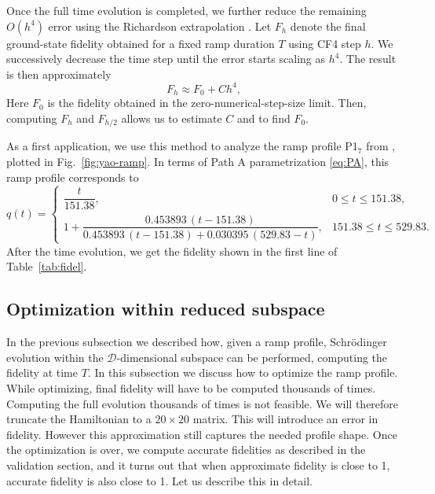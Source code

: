 \documentclass[a4paper,12pt]{article}
\theoremstyle{remark}
\theoremstyle{theorem}
\begin{document}
Once the full time evolution is completed, we further reduce the remaining $O(h^4)$ error using the Richardson extrapolation \cite{Richardson1911}.  Let $F_h$ denote the final ground-state fidelity obtained for a fixed ramp duration $T$ using CF4 step $h$.  We successively decrease the time step until the error starts scaling as $h^4$. The result is then approximately
\begin{equation}
F_{h}\approx F_{0}+C h^4,
\end{equation}
Here $F_{0}$ is the fidelity obtained in the zero-numerical-step-size limit.  Then, computing $F_h$ and $F_{h/2}$ allows us to estimate $ C$ and to find $F_{0}$.

As a first application, we use this method to analyze the ramp profile P1$_7$ from \cite{Fang:2024uyf}, plotted in Fig.~\ref{fig:yao-ramp}.
In terms of Path A parametrization \eqref{eq:PA}, this ramp profile corresponds to 
\begin{equation}
q(t)=
\begin{cases}
\dfrac{t}{151.38},
&0\leq t\leq151.38,\\[10pt]
1+
\dfrac{
0.453893\,(t-151.38)
}{
0.453893\,(t-151.38)
+
0.030395\,(529.83-t)
},
&151.38\leq t\leq529.83.
\end{cases}
\end{equation}
After the time evolution, we get the fidelity shown in the first line of Table~\ref{tab:fidel}. 

\subsection{Optimization within reduced subspace}\label{sec:reduced}

In the previous subsection we described how, given a ramp profile, Schr\"odinger evolution within the $\mathcal{D}$-dimensional subspace can be performed, computing the fidelity at time $T$. In this subsection we discuss how to optimize the ramp profile. While optimizing, final fidelity will have to be computed thousands of times. Computing the full evolution thousands of times is not feasible. We will therefore truncate the Hamiltonian to a $20\times 20$ matrix. This will introduce an error in fidelity. However this approximation still captures the needed profile shape. Once the optimization is over, we compute accurate fidelities as described in the validation section, and it turns out that when approximate fidelity is close to 1, accurate fidelity is also close to 1. Let us describe this in detail.
\end{document}
